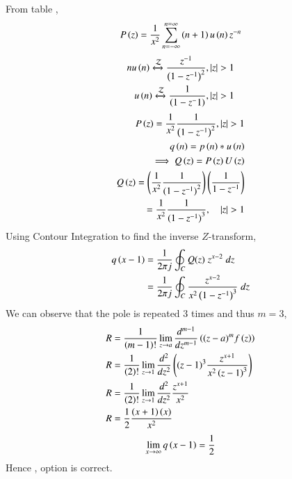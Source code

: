 \documentclass[beamer]{IEEEtran}
\theoremstyle{remark}
\begin{document}
From table ,
\begin{align}
    P\left(z\right)=\frac{1}{x^2}\sum_{n=-\infty}^{n=\infty}\left(n+1\right)u\left(n\right)z^{-n} 
\end{align}
\begin{align}
	n u\left(n\right)\xleftrightarrow{\mathcal{Z}} \frac{z^{-1}}{\left(1-z^{-1}\right)^2} ,   \left\vert z\right\vert >1 \\
   u\left(n\right)\xleftrightarrow{\mathcal{Z}} \frac{1}{\left(1-z^-1\right)} ,   \left\vert z\right\vert >1  
\end{align}
\begin{align}
  P\left(z\right)=\frac{1}{x^2}\frac{1}{\left(1-z^{-1}\right)^2} , \left\vert z\right\vert >1\\
    q\left(n\right)=p\left(n\right)\ast u\left(n\right)\\
	\implies Q\left(z\right)=P\left(z\right)U\left(z\right)   \\
	 Q\left(z\right)=\left(\frac{1}{x^2}\frac{1}{({1-z^{-1})}^{2}}\right)\left(\frac{1}{1-z^{-1}}\right)  \\
	 =\frac{1}{x^2}\frac{1}{({1-z^{-1})}^{3}} ,\quad \left\vert z\right\vert>1
\end{align}
Using Contour Integration to find the inverse $Z$-transform,
\begin{align}
    q\left(x-1\right)&=\frac{1}{2\pi j}\oint_{C}Q(z) \;z^{x-2} \;dz  \\
    &=\frac{1}{2\pi j}\oint_{C}\frac{z^{x-2}}{x^2\left(1-z^{-1}\right)^{3}} \;dz 
\end{align}
We can observe that the pole is repeated $3$ times and thus $m=3$,
\begin{align}
    R&=\frac{1}{\left(m-1\right)!}\lim\limits_{z\to a}\frac{d^{m-1}}{dz^{m-1}}\left({(z-a)}^{m}f\left(z\right)\right) \\
    R&=\frac{1}{\left(2\right)!}\lim\limits_{z\to 1}\frac{d^{2}}{dz^{2}}\left({(z-1)}^{3}\frac{z^{x+1}}{x^2\left(z-1\right)^3}\right) \\
    R&=\frac{1}{\left(2\right)!}\lim\limits_{z\to 1}\frac{d^{2}}{dz^{2}} \frac{z^{x+1}}{x^2} \\
    R&=\frac{1}{2}\frac{\left(x+1\right)\left(x\right)}{x^2} 
\end{align}
\begin{align}
    \lim_{x\to\infty}q\left(x-1\right)=\frac{1}{2}
\end{align}
Hence , option  is correct.
\end{document}
